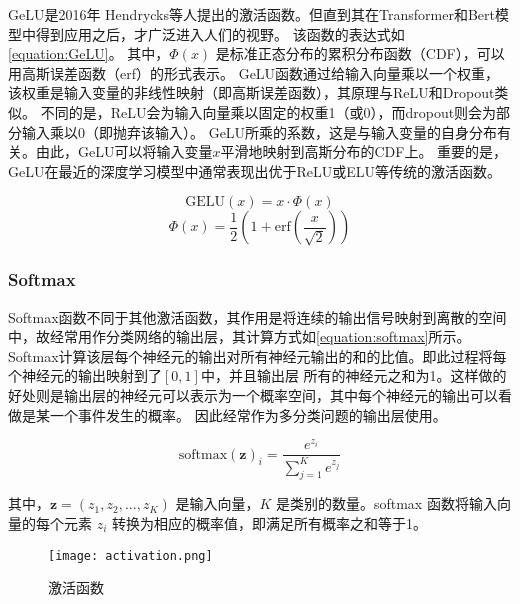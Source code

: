   GeLU是2016年 Hendrycks等人提出的激活函数\cite{2016GeLU}。但直到其在Transformer和Bert模型中得到应用之后，才广泛进入人们的视野。
  该函数的表达式如\cref{equation:GeLU}。
  其中，$\Phi(x)$ 是标准正态分布的累积分布函数（CDF），可以用高斯误差函数（erf）的形式表示。
  GeLU函数通过给输入向量乘以一个权重，该权重是输入变量的非线性映射（即高斯误差函数），其原理与ReLU和Dropout类似。
  不同的是，ReLU会为输入向量乘以固定的权重1（或0），而dropout则会为部分输入乘以0（即抛弃该输入）。
  GeLU所乘的系数，这是与输入变量的自身分布有关。由此，GeLU可以将输入变量$x$平滑地映射到高斯分布的CDF上。
  重要的是，GeLU在最近的深度学习模型中通常表现出优于ReLU或ELU等传统的激活函数。

  \begin{equation}
    \label{equation:GeLU}
    \text{GELU}(x) = x \cdot \Phi(x) 
  \end{equation}
   \begin{equation}
    \label{equation:Gauss}
    \Phi(x) = \frac{1}{2} \left(1 + \text{erf} \left(\frac{x}{\sqrt{2}}\right)\right)
  \end{equation}
  

  \subsubsection{Softmax}

  Softmax函数不同于其他激活函数，其作用是将连续的输出信号映射到离散的空间中，故经常用作分类网络的输出层，其计算方式如\cref{equation:softmax}所示。
  Softmax计算该层每个神经元的输出对所有神经元输出的和的比值。即此过程将每个神经元的输出映射到了$[0,1]$中，并且输出层
  所有的神经元之和为1。这样做的好处则是输出层的神经元可以表示为一个概率空间，其中每个神经元的输出可以看做是某一个事件发生的概率。
  因此经常作为多分类问题的输出层使用。

\begin{equation}
  \label{equation:softmax}
  \text{softmax}(\mathbf{z})_i = \frac{e^{z_i}}{\sum_{j=1}^{K} e^{z_j}}
\end{equation}

其中，$\mathbf{z} = (z_1, z_2, ..., z_K)$ 是输入向量，$K$ 是类别的数量。softmax 函数将输入向量的每个元素 $z_i$ 转换为相应的概率值，即满足所有概率之和等于1。



\begin{figure}[h]
  \centering
\texttt{[image: activation.png]}
\caption{激活函数}
\label{figure:activation}
  
\end{figure}



